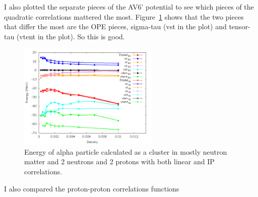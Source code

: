 \documentclass[12pt]{article}
\begin{document}
I also plotted the separate pieces of the AV6' potential to see which pieces of the quadratic correlations mattered the most. Figure~\ref{fig:av6_alpha_linVSip} shows that the two pieces that differ the most are the OPE pieces, sigma-tau (vst in the plot) and tensor-tau (vtent in the plot). So this is good.
\begin{figure}[h!]
   \centering
   \includegraphics[width=0.60\textwidth]{../../av6_alpha_linVSip.png}
   \caption{Energy of alpha particle calculated as a cluster in mostly neutron matter and 2 neutrons and 2 protons with both linear and IP correlations.}
   \label{fig:av6_alpha_linVSip}
\end{figure}

I also compared the proton-proton correlations functions
\end{document}
